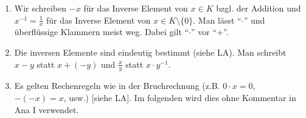 \documentclass[12pt]{scrreprt}
\begin{document}
\begin{bem*}
\begin{enumerate} %
\item Wir schreiben $-x$ für das Inverse Element von $x \in K$ bzgl. der Addition und $\displaystyle x^{-1} = \frac{1}{x}$ für das Inverse Element von $x \in K \setminus \{0\}$. Man lässt "`$\cdot$"' und überflüssige Klammern meist weg. Dabei gilt "`$\cdot$"' vor "`$+$"'.

\item Die inversen Elemente sind eindeutig bestimmt (siehe LA). Man schreibt $x - y$ statt $x + (-y)$ und $\displaystyle\frac{x}{y}$ statt $x \cdot y^{-1}$.

\item Es gelten Rechenregeln wie in der Bruchrechnung (z.B. $0 \cdot x = 0$, $-(-x) = x$, usw.) [siehe LA]. Im folgenden wird dies ohne Kommentar in Ana I verwendet.
\end{enumerate}
\end{bem*}
\end{document}
